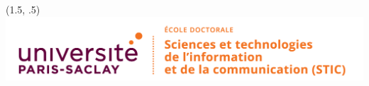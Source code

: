
\pagestyle{empty}


\setlength{\fboxsep}{5mm}
\areaset
  {\textwidth}%
  {\dimexpr\the{}\relax}%

\begin{textblock}{1}(1.5, .5)
\includegraphics[scale=.75]{../gfx/STIC.png} %
\end{textblock}

